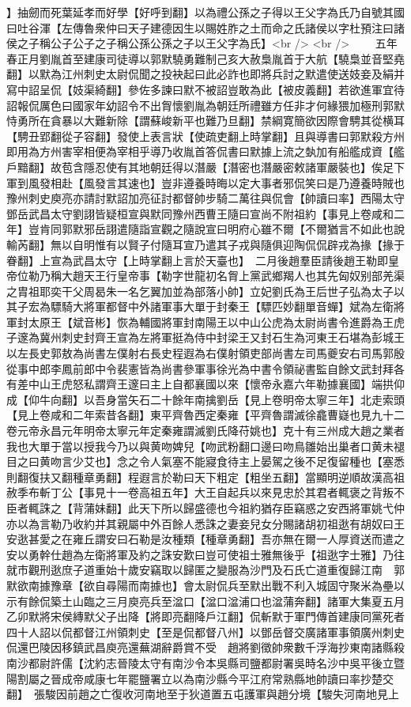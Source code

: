 】抽劒而死葉延孝而好學【好呼到翻】以為禮公孫之子得以王父字為氏乃自號其國曰吐谷渾【左傳魯衆仲曰天子建德因生以賜姓胙之土而命之氏諸侯以字杜預注曰諸侯之子稱公子公子之子稱公孫公孫之子以王父字為氏】<br />
<br />
　　五年春正月劉胤首至建康司徒導以郭默驍勇難制己亥大赦梟胤首于大航【驍梟並音堅堯翻】以默為江州刺史太尉侃聞之投袂起曰此必詐也即將兵討之默遣使送妓妾及絹并寫中詔呈侃【妓渠綺翻】參佐多諫曰默不被詔豈敢為此【被皮義翻】若欲進軍宜待詔報侃厲色曰國家年幼詔令不出胷懷劉胤為朝廷所禮雖方任非才何緣猥加極刑郭默恃勇所在貪暴以大難新除【謂蘇峻新平也難乃旦翻】禁綱寛簡欲因際會騁其從横耳【騁丑郢翻從子容翻】發使上表言狀【使疏吏翻上時掌翻】且與導書曰郭默殺方州即用為方州害宰相便為宰相乎導乃收胤首答侃書曰默據上流之埶加有船艦成資【艦戶黯翻】故苞含隱忍使有其地朝廷得以潛嚴【潛密也潛嚴密敕諸軍嚴裝也】俟足下軍到風發相赴【風發言其速也】豈非遵養時晦以定大事者邪侃笑曰是乃遵養時賊也豫州刺史庾亮亦請討默詔加亮征討都督帥步騎二萬往與侃會【帥讀曰率】西陽太守鄧岳武昌太守劉詡皆疑桓宣與默同豫州西曹王隨曰宣尚不附祖約【事見上卷咸和二年】豈肯同郭默邪岳詡遣隨詣宣觀之隨說宣曰明府心雖不爾【不爾猶言不如此也說輸芮翻】無以自明惟有以賢子付隨耳宣乃遣其子戎與隨俱迎陶侃侃辟戎為掾【掾于眷翻】上宣為武昌太守【上時掌翻上言於天臺也】　二月後趙羣臣請後趙王勒即皇帝位勒乃稱大趙天王行皇帝事【勒字世龍初名胷上黨武鄉羯人也其先匈奴别部羌渠之胄祖耶奕干父周曷朱一名乞翼加並為部落小帥】立妃劉氏為王后世子弘為太子以其子宏為驃騎大將軍都督中外諸軍事大單于封秦王【驃匹妙翻單音蟬】斌為左衛將軍封太原王【斌音彬】恢為輔國將軍封南陽王以中山公虎為太尉尚書令進爵為王虎子邃為冀州刺史封齊王宣為左將軍挺為侍中封梁王又封石生為河東王石堪為彭城王以左長史郭敖為尚書左僕射右長史程遐為右僕射領吏部尚書左司馬夔安右司馬郭殷從事中郎李鳳前郎中令裴憲皆為尚書參軍事徐光為中書令領祕書監自餘文武封拜各有差中山王虎怒私謂齊王邃曰主上自都襄國以來【懷帝永嘉六年勒據襄國】端拱仰成【仰牛向翻】以吾身當矢石二十餘年南擒劉岳【見上卷明帝太寧三年】北走索頭【見上卷咸和二年索昔各翻】東平齊魯西定秦雍【平齊魯謂滅徐龕曹嶷也見九十二卷元帝永昌元年明帝太寧元年定秦雍謂滅劉氏降苻姚也】克十有三州成大趙之業者我也大單于當以授我今乃以與黄吻婢兒【吻武粉翻口邊曰吻鳥雛始出巢者口黄未褪目之曰黄吻言少艾也】念之令人氣塞不能寢食待主上晏駕之後不足復留種也【塞悉則翻復扶又翻種章勇翻】程遐言於勒曰天下粗定【粗坐五翻】當顯明逆順故漢高祖赦季布斬丁公【事見十一卷高祖五年】大王自起兵以來見忠於其君者輒褒之背叛不臣者輒誅之【背蒲妹翻】此天下所以歸盛德也今祖約猶存臣竊惑之安西將軍姚弋仲亦以為言勒乃收約并其親屬中外百餘人悉誅之妻妾兒女分賜諸胡初祖逖有胡奴曰王安逖甚愛之在雍丘謂安曰石勒是汝種類【種章勇翻】吾亦無在爾一人厚資送而遣之安以勇幹仕趙為左衛將軍及約之誅安歎曰豈可使祖士雅無後乎【祖逖字士雅】乃往就市觀刑逖庶子道重始十歲安竊取以歸匿之變服為沙門及石氏亡道重復歸江南　郭默欲南據豫章【欲自尋陽而南據也】會太尉侃兵至默出戰不利入城固守聚米為壘以示有餘侃築土山臨之三月庾亮兵至湓口【湓口湓浦口也湓蒲奔翻】諸軍大集夏五月乙卯默將宋侯縳默父子出降【將即亮翻降戶江翻】侃斬默于軍門傳首建康同黨死者四十人詔以侃都督江州領刺史【至是侃都督八州】以鄧岳督交廣諸軍事領廣州刺史侃還巴陵因移鎮武昌庾亮還蕪湖辭爵賞不受　趙將劉徵帥衆數千浮海抄東南諸縣殺南沙都尉許儒【沈約志晉陵太守有南沙令本吳縣司鹽都尉署吳時名沙中吳平後立暨陽割屬之晉成帝咸康七年罷鹽署立以為南沙縣今平江府常熟縣地帥讀曰率抄楚交翻】　張駿因前趙之亡復收河南地至于狄道置五屯護軍與趙分境【駿失河南地見上